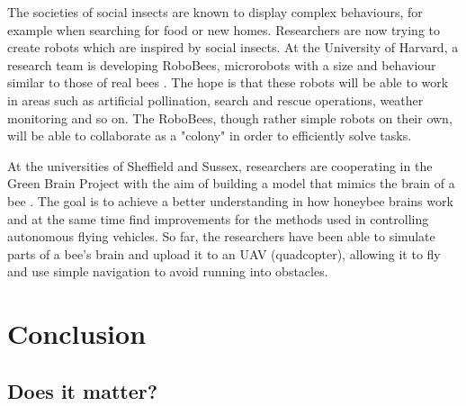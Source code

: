 \documentclass[11pt]{article}
\newenvironment{draft}{\color{dark-cornflower-blue-2}}{\ignorespacesafterend}
\begin{document}
\begin{draft}
The societies of social insects are known to display complex behaviours, for example when searching for food or new homes. Researchers are now trying to create robots which are inspired by social insects. At the University of Harvard, a research team is developing RoboBees, microrobots with a size and behaviour similar to those of real bees \cite{robobees2015}. The hope is that these robots will be able to work in areas such as artificial pollination, search and rescue operations, weather monitoring and so on. The RoboBees, though rather simple robots on their own, will be able to collaborate as a "colony" in order to efficiently solve tasks.

At the universities of Sheffield and Sussex, researchers are cooperating in the Green Brain Project with the aim of building a model that mimics the brain of a bee \cite{greenbrain2015}. The goal is to achieve a better understanding in how honeybee brains work and at the same time find improvements for the methods used in controlling autonomous flying vehicles. So far, the researchers have been able to simulate parts of a bee's brain and upload it to an UAV (quadcopter), allowing it to fly and use simple navigation to avoid running into obstacles.

\end{draft}


\section{Conclusion}
\label{sec:conclusion}

\subsection{Does it matter?}
\end{document}
